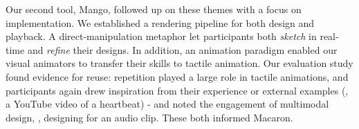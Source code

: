 Our second tool, Mango, followed up on these themes with a focus on implementation.
We established a rendering pipeline for both design and playback.
A direct-manipulation metaphor let participants both \emph{sketch} in real-time and \emph{refine} their designs.
In addition, an animation paradigm enabled our visual animators to transfer their skills to tactile animation.
Our evaluation study found evidence for reuse: repetition played a large role in tactile animations, and participants again drew inspiration from their experience or external examples (\eg, a YouTube video of a heartbeat) - and noted the engagement of multimodal design, \eg, designing for an audio clip.
These both informed Macaron.


